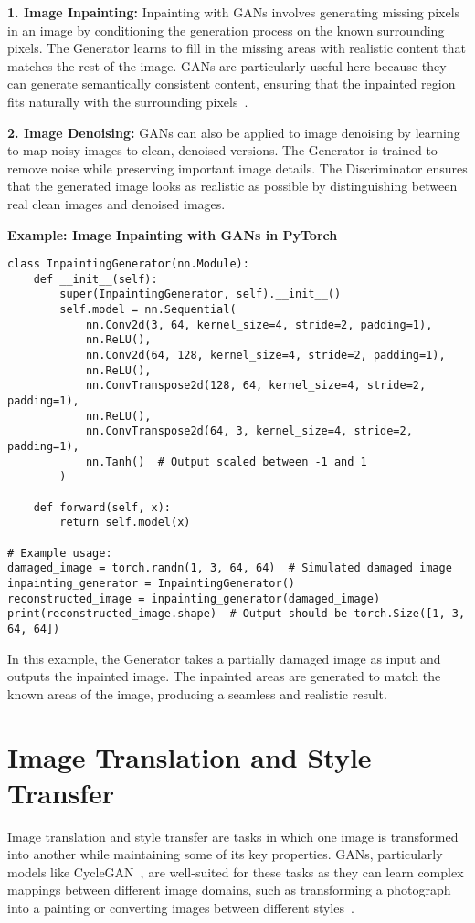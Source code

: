 \textbf{1. Image Inpainting:}  
Inpainting with GANs involves generating missing pixels in an image by conditioning the generation process on the known surrounding pixels. The Generator learns to fill in the missing areas with realistic content that matches the rest of the image. GANs are particularly useful here because they can generate semantically consistent content, ensuring that the inpainted region fits naturally with the surrounding pixels~\cite{pang2021image}.

\textbf{2. Image Denoising:}  
GANs can also be applied to image denoising by learning to map noisy images to clean, denoised versions. The Generator is trained to remove noise while preserving important image details. The Discriminator ensures that the generated image looks as realistic as possible by distinguishing between real clean images and denoised images.

\textbf{Example: Image Inpainting with GANs in PyTorch}

\begin{lstlisting}[style=python]
class InpaintingGenerator(nn.Module):
    def __init__(self):
        super(InpaintingGenerator, self).__init__()
        self.model = nn.Sequential(
            nn.Conv2d(3, 64, kernel_size=4, stride=2, padding=1),
            nn.ReLU(),
            nn.Conv2d(64, 128, kernel_size=4, stride=2, padding=1),
            nn.ReLU(),
            nn.ConvTranspose2d(128, 64, kernel_size=4, stride=2, padding=1),
            nn.ReLU(),
            nn.ConvTranspose2d(64, 3, kernel_size=4, stride=2, padding=1),
            nn.Tanh()  # Output scaled between -1 and 1
        )

    def forward(self, x):
        return self.model(x)

# Example usage:
damaged_image = torch.randn(1, 3, 64, 64)  # Simulated damaged image
inpainting_generator = InpaintingGenerator()
reconstructed_image = inpainting_generator(damaged_image)
print(reconstructed_image.shape)  # Output should be torch.Size([1, 3, 64, 64])
\end{lstlisting}

In this example, the Generator takes a partially damaged image as input and outputs the inpainted image. The inpainted areas are generated to match the known areas of the image, producing a seamless and realistic result.

\section{Image Translation and Style Transfer}
Image translation and style transfer are tasks in which one image is transformed into another while maintaining some of its key properties. GANs, particularly models like CycleGAN~\cite{chu2017cyclegan}, are well-suited for these tasks as they can learn complex mappings between different image domains, such as transforming a photograph into a painting or converting images between different styles~\cite{karras2019style}.

